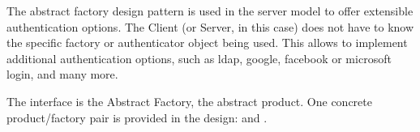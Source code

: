 The abstract factory design pattern is used in the server model to offer extensible authentication options. The Client (or Server, in this case) does not have to know the specific factory or authenticator object being used. This allows to implement additional authentication options, such as ldap, google, facebook or microsoft login, and many more.

The interface  is the Abstract Factory,  the abstract product. One concrete product/factory pair is provided in the design:  and .